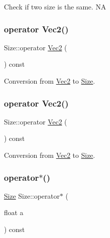 Check if two size is the same.  NA \mbox{\label{classSize_a3016d7e4f7214c4a190511c1b7ea30a4}} 
\subsubsection{\texorpdfstring{operator Vec2()}{operator Vec2()}\hspace{0.1cm}{\footnotesize\ttfamily [1/2]}}
{\footnotesize\ttfamily Size\+::operator \hyperlink{classVec2}{Vec2} (\begin{DoxyParamCaption}{ }\end{DoxyParamCaption}) const\hspace{0.3cm}{\ttfamily [inline]}}

Conversion from \hyperlink{classVec2}{Vec2} to \hyperlink{classSize}{Size}. \mbox{\label{classSize_a3016d7e4f7214c4a190511c1b7ea30a4}} 
\subsubsection{\texorpdfstring{operator Vec2()}{operator Vec2()}\hspace{0.1cm}{\footnotesize\ttfamily [2/2]}}
{\footnotesize\ttfamily Size\+::operator \hyperlink{classVec2}{Vec2} (\begin{DoxyParamCaption}{ }\end{DoxyParamCaption}) const\hspace{0.3cm}{\ttfamily [inline]}}

Conversion from \hyperlink{classVec2}{Vec2} to \hyperlink{classSize}{Size}. \mbox{\label{classSize_aa927f929575591818d750e79453601c3}} 
\subsubsection{\texorpdfstring{operator$\ast$()}{operator*()}\hspace{0.1cm}{\footnotesize\ttfamily [1/2]}}
{\footnotesize\ttfamily \hyperlink{classSize}{Size} Size\+::operator$\ast$ (\begin{DoxyParamCaption}\item[{float}]{a }\end{DoxyParamCaption}) const}

